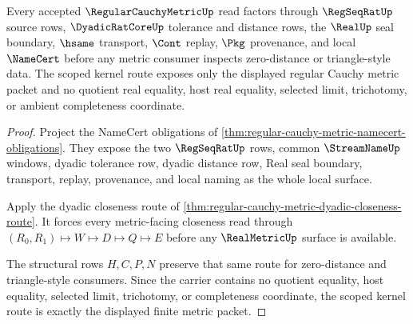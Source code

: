 \begin{theorem}\label{thm:regular-cauchy-metric-scoped-kernel-route}
Every accepted $\RegularCauchyMetricUp$ read factors through $\RegSeqRatUp$ source rows, $\DyadicRatCoreUp$ tolerance and distance rows, the $\RealUp$ seal boundary, $\hsame$ transport, $\Cont$ replay, $\Pkg$ provenance, and local $\NameCert$ before any metric consumer inspects zero-distance or triangle-style data. The scoped kernel route exposes only the displayed regular Cauchy metric packet and no quotient real equality, host real equality, selected limit, trichotomy, or ambient completeness coordinate.
\end{theorem}
\begin{proof}
Project the NameCert obligations of \autoref{thm:regular-cauchy-metric-namecert-obligations}. They expose the two $\RegSeqRatUp$ rows, common $\StreamNameUp$ windows, dyadic tolerance row, dyadic distance row, Real seal boundary, transport, replay, provenance, and local naming as the whole local surface.

Apply the dyadic closeness route of \autoref{thm:regular-cauchy-metric-dyadic-closeness-route}. It forces every metric-facing closeness read through $(R_0,R_1)\longmapsto W\longmapsto D\longmapsto Q\longmapsto E$ before any $\RealMetricUp$ surface is available.

The structural rows $H,C,P,N$ preserve that same route for zero-distance and triangle-style consumers. Since the carrier contains no quotient equality, host equality, selected limit, trichotomy, or completeness coordinate, the scoped kernel route is exactly the displayed finite metric packet.
\end{proof}

